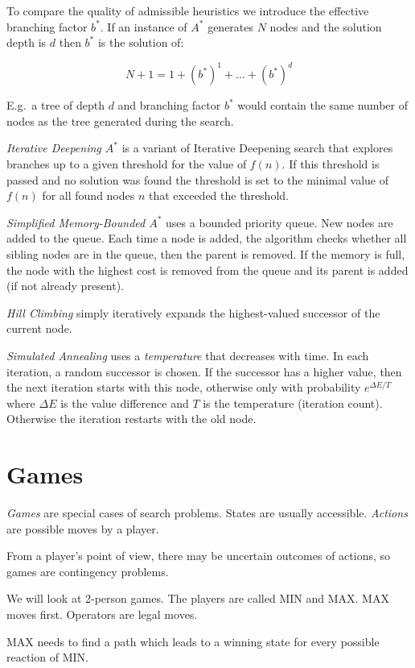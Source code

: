 \documentclass[english]{panikzettel}
\begin{document}
To compare the quality of admissible heuristics we introduce the effective branching factor $b^\ast$. If an instance of $A^\ast$ generates $N$ nodes and the solution depth is $d$ then $b^\ast$ is the solution of:

\[N+1 = 1 + \left(b^\ast \right)^1  + \dots + \left(b^\ast\right)^d\]

E.g.\ a tree of depth $d$ and branching factor $b^\ast$ would contain the same number of nodes as the tree generated during the search.

\emph{Iterative Deepening $A^\ast$} is a variant of Iterative Deepening search that explores branches up to a given threshold for the value of $f(n)$. If this threshold is passed and no solution was found the threshold is set to the minimal value of $f(n)$ for all found nodes $n$ that exceeded the threshold.

\emph{Simplified Memory-Bounded $A^\ast$} uses a bounded priority queue. New nodes are added to the queue.
Each time a node is added, the algorithm checks whether all sibling nodes are in the queue, then the parent is removed.
If the memory is full, the node with the highest cost is removed from the queue and its parent is added (if not already present).

\emph{Hill Climbing} simply iteratively expands the highest-valued successor of the current node.

\emph{Simulated Annealing} uses a \emph{temperature} that decreases with time. In each iteration, a random successor is chosen.
If the successor has a higher value, then the next iteration starts with this node, otherwise only with probability $e^{\Delta E / T}$ where $\Delta E$ is the value difference and $T$ is the temperature (iteration count).
Otherwise the iteration restarts with the old node.

\newpage
\section{Games}

\emph{Games} are special cases of search problems.
States are usually accessible.
\emph{Actions} are possible moves by a player.

From a player's point of view, there may be uncertain outcomes of actions, so games are contingency problems.

We will look at 2-person games.
The players are called MIN and MAX.
MAX moves first.
Operators are legal moves.

MAX needs to find a path which leads to a winning state for every possible reaction of MIN.
\end{document}
